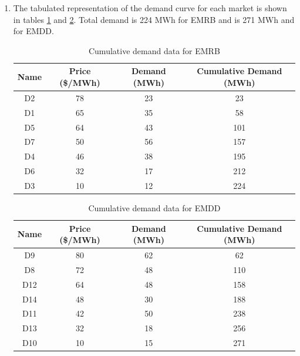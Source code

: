 \documentclass{homework}
\begin{document}
\begin{enumerate}
    \item The tabulated representation of the demand curve for each market is shown 
    in tables \ref{tab:EMRB-dem} and \ref{tab:EMDD-dem}.
    Total demand is 224 MWh for EMRB and is 271 MWh and for EMDD.

\begin{table}
    \centering
    \begin{tabular}{|c|c|c|c|}
        \hline
        Name & Price (\$/MWh) & Demand (MWh) &   Cumulative Demand (MWh) \\
        \hline
        D2  &     78   &     23   &   23  \\
        D1  &     65   &     35   &   58  \\
        D5  &     64   &     43   &  101  \\
        D7  &     50   &     56   &  157  \\
        D4  &     46   &     38   &  195  \\
        D6  &     32   &     17   &  212  \\
        D3  &     10   &     12   &  224  \\
        \hline
    \end{tabular}
    \caption{Cumulative demand data for EMRB}
    \label{tab:EMRB-dem}
\end{table}

\begin{table}
    \centering
    \begin{tabular}{|c|c|c|c|}
        \hline
        Name & Price (\$/MWh) & Demand (MWh) &   Cumulative Demand (MWh) \\
        \hline
            D9       & 80     &          62    &         62 \\
            D8       & 72     &          48    &        110 \\
            D12      & 64     &          48    &        158 \\
            D14      & 48     &          30    &        188 \\
            D11      & 42     &          50    &        238 \\
            D13      & 32     &          18    &        256 \\
            D10      & 10     &          15    &        271 \\
        \hline
    \end{tabular}
    \caption{Cumulative demand data for EMDD}
    \label{tab:EMDD-dem}
\end{table}


\end{enumerate}
\end{document}
